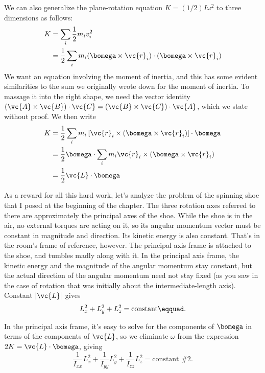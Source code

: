We can also generalize the plane-rotation equation
$K=(1/2)I\omega^2$ to three dimensions as follows:
\begin{align*}
        K        &= \sum_i \frac{1}{2} m_i v_i^2 \\
                & = \frac{1}{2} \sum_i m_i (\bomega \times \vc{r}_i) \cdot (\bomega \times \vc{r}_i) 
\end{align*}
We want an equation involving the moment of inertia, and
this has some evident similarities to the sum we originally
wrote down for the moment of inertia. To massage it into the
right shape, we need the vector identity 
$(\vc{A}\times\vc{B})\cdot\vc{C}= (\vc{B}\times\vc{C}) \cdot \vc{A}$,
which we state without proof. We then write
\begin{align*}
        K        & = \frac{1}{2} \sum_i m_i 
                        \left[ \vc{r}_i \times (\bomega \times \vc{r}_i)
                        \right] \cdot \bomega \\
                &= \frac{1}{2} \bomega \cdot \sum_i m_i\vc{r}_i \times (\bomega \times \vc{r}_i)  \\
                &= \frac{1}{2} \vc{L} \cdot \bomega
\end{align*}

As a reward for all this hard work, let's analyze the
problem of the spinning shoe that I posed at the beginning
of the chapter. The three rotation axes referred to there
are approximately the principal axes of the shoe. While the
shoe is in the air, no external torques are acting on it, so
its angular momentum vector must be constant in magnitude
and direction. Its kinetic energy is also constant. That's in the room's
frame of reference, however. The principal axis frame is
attached to the shoe, and tumbles madly along with it. In
the principal axis frame, the kinetic energy and the magnitude of the
angular momentum stay constant, but the actual direction of
the angular momentum need not stay fixed (as you saw in the
case of rotation that was initially about the
intermediate-length axis). Constant $|\vc{L}|$ gives
\begin{equation*}
        L_x^2 + L_y^2+ L_z^2   =   \text{constant}\eqquad.
\end{equation*}

In the principal axis frame, it's easy to solve for the components of $\bomega$ in
terms of the components of $\vc{L}$, so we eliminate $\omega$ from the expression $2K=\vc{L}\cdot\bomega$, giving        
\begin{equation*}
   \frac{1}{I_{xx}}L_x^2 +  \frac{1}{I_{yy}}L_y^2 +  \frac{1}{I_{zz}}L_z^2 =   \text{constant \#2}  .
\end{equation*}


